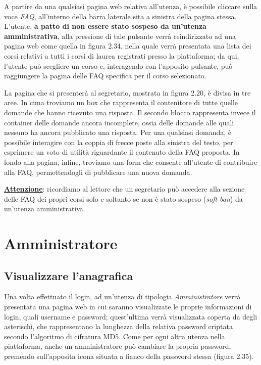 \documentclass [a4paper,11pt]{book}
\begin{document}
A partire da una qualsiasi pagina web relativa all'utenza, è possibile cliccare sulla voce \emph{FAQ}, all'interno della barra laterale sita a sinistra della pagina stessa. L'utente, \textbf{a patto di non essere stato sospeso da un'utenza amministrativa}, alla pressione di tale pulsante verrà reindirizzato ad una pagina web come quella in figura 2.34, nella quale verrà presentata una lista dei corsi relativi a tutti i corsi di laurea registrati presso la piattaforma; da qui, l'utente può scegliere un corso e, interagendo con l'apposito pulsante, può raggiungere la pagina delle FAQ specifica per il corso selezionato.


La pagina che si presenterà al segretario, mostrata in figura 2.20, è divisa in tre aree. In cima troviamo un box che rappresenta il contenitore di tutte quelle domande che hanno ricevuto una risposta. Il secondo blocco rappresenta invece il container delle domande ancora incomplete, ossia delle domande alle quali nessuno ha ancora pubblicato una risposta. Per una qualsiasi domanda, è possibile interagire con la coppia di frecce poste alla sinistra del testo, per esprimere un voto di utilità riguardante il contenuto della FAQ proposta. In fondo alla pagina, infine, troviamo una form che consente all'utente di contribuire alla FAQ, permettendogli di pubblicare una nuova domanda. 

\medskip

\textbf{\underline{Attenzione}}: ricordiamo al lettore che un segretario può accedere alla sezione delle FAQ dei propri corsi solo e soltanto se non è stato sospeso (\emph{soft ban}) da un'utenza amministrativa.

\medskip
\medskip

\section{Amministratore}

\subsection{Visualizzare l'anagrafica}

Una volta effettuato il login, ad un'utenza di tipologia \emph{Amministratore} verrà presentata una pagina web in cui saranno visualizzate le proprie informazioni di login, quali username e password; quest'ultima verrà visualizzata coperta da degli asterischi, che rappresentano la lunghezza della relativa password criptata secondo l'algoritmo di cifratura MD5. Come per ogni altra utenza nella piattaforma, anche un amministratore può cambiare la propria password, premendo sull'apposita icona situata a fianco della password stessa (figura 2.35). 
\end{document}
